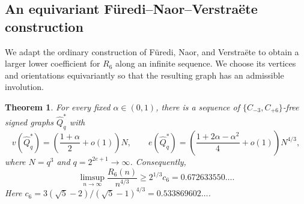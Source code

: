 \documentclass{article}
\newtheorem{theorem}{Theorem}[section]
\theoremstyle{definition}
\theoremstyle{remark}
\begin{document}
\subsection{An equivariant F\"uredi--Naor--Verstra\"ete construction}

We adapt the ordinary construction of F\"uredi, Naor, and Verstra\"ete
\cite{MR2227729} to obtain a larger lower coefficient for $R_6$ along
an infinite sequence.  We choose its vertices and orientations
equivariantly so that the resulting graph has an admissible involution.

\begin{theorem}\label{thm:equivariant-FNV}
For every fixed $\alpha\in(0,1)$, there is a sequence of
$\{C_{-3},C_{+6}\}$-free signed graphs $\widehat Q_q^*$ with
\[
v(\widehat Q_q^*)=\left(\frac{1+\alpha}{2}+o(1)\right)N,\qquad
e(\widehat Q_q^*)=
\left(\frac{1+2\alpha-\alpha^2}{4}+o(1)\right)N^{4/3},
\]
where $N=q^3$ and $q=2^{2e+1}\to\infty$.  Consequently,
\[
\limsup_{n\to\infty}\frac{R_6(n)}{n^{4/3}}
\geq2^{1/3}c_6=0.672633550\ldots.
\]
Here $c_6=3(\sqrt5-2)/(\sqrt5-1)^{4/3}=0.533869602\ldots$.
\end{theorem}
\end{document}
